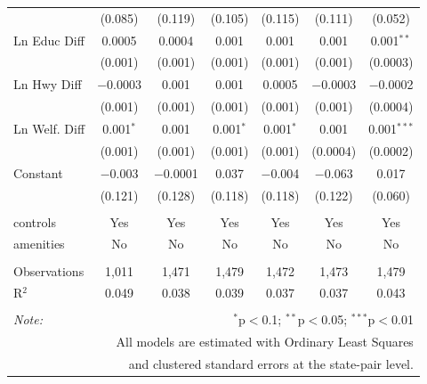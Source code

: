 \begin{table}[!htbp]
\begin{tabular}{@{\extracolsep{5pt}}lcccccc}
  & (0.085) & (0.119) & (0.105) & (0.115) & (0.111) & (0.052) \\ 
  Ln Educ Diff & 0.0005 & 0.0004 & 0.001 & 0.001 & 0.001 & 0.001$^{**}$ \\ 
  & (0.001) & (0.001) & (0.001) & (0.001) & (0.001) & (0.0003) \\ 
  Ln Hwy Diff & $-$0.0003 & 0.001 & 0.001 & 0.0005 & $-$0.0003 & $-$0.0002 \\ 
  & (0.001) & (0.001) & (0.001) & (0.001) & (0.001) & (0.0004) \\ 
  Ln Welf. Diff & 0.001$^{*}$ & 0.001 & 0.001$^{*}$ & 0.001$^{*}$ & 0.001 & 0.001$^{***}$ \\ 
  & (0.001) & (0.001) & (0.001) & (0.001) & (0.0004) & (0.0002) \\ 
  Constant & $-$0.003 & $-$0.0001 & 0.037 & $-$0.004 & $-$0.063 & 0.017 \\ 
  & (0.121) & (0.128) & (0.118) & (0.118) & (0.122) & (0.060) \\ 
 \hline \\[-1.8ex] 
controls & Yes & Yes & Yes & Yes & Yes & Yes \\ 
amenities & No & No & No & No & No & No \\ 
\hline \\[-1.8ex] 
Observations & 1,011 & 1,471 & 1,479 & 1,472 & 1,473 & 1,479 \\ 
R$^{2}$ & 0.049 & 0.038 & 0.039 & 0.037 & 0.037 & 0.043 \\ 
\hline 
\hline \\[-1.8ex] 
\textit{Note:}  & \multicolumn{6}{r}{$^{*}$p$<$0.1; $^{**}$p$<$0.05; $^{***}$p$<$0.01} \\ 
 & \multicolumn{6}{r}{All models are estimated with Ordinary Least Squares} \\ 
 & \multicolumn{6}{r}{and clustered standard errors at the state-pair level.} \\ 
\end{tabular} 
\end{table} 
